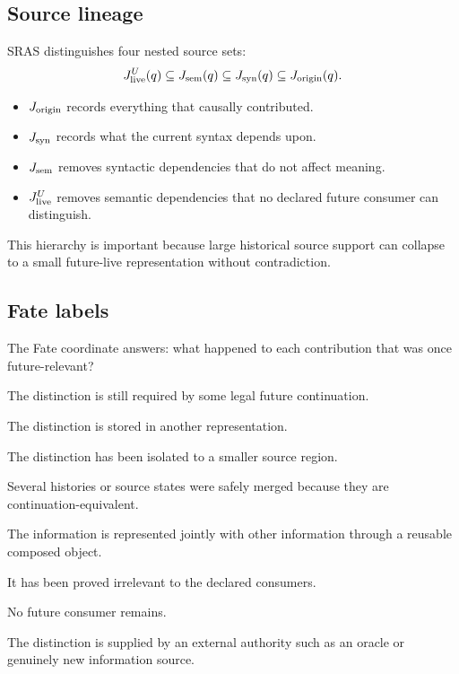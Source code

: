 \documentclass[11pt]{article}
\theoremstyle{plain}
\theoremstyle{definition}
\theoremstyle{remark}
\begin{document}
\subsection{Source lineage}

SRAS distinguishes four nested source sets:
\[
J_{\rm live}^{U}(q)
\subseteq
J_{\rm sem}(q)
\subseteq
J_{\rm syn}(q)
\subseteq
J_{\rm origin}(q).
\]

\begin{itemize}[leftmargin=1.4em]
\item $J_{\rm origin}$ records everything that causally contributed.
\item $J_{\rm syn}$ records what the current syntax depends upon.
\item $J_{\rm sem}$ removes syntactic dependencies that do not affect meaning.
\item $J_{\rm live}^{U}$ removes semantic dependencies that no declared future
consumer can distinguish.
\end{itemize}

This hierarchy is important because large historical source support can
collapse to a small future-live representation without contradiction.

\subsection{Fate labels}

The Fate coordinate answers: what happened to each contribution that was once
future-relevant?

\begin{description}[leftmargin=1.7em,style=nextline]
\item[LIVE] The distinction is still required by some legal future continuation.
\item[ENCODED] The distinction is stored in another representation.
\item[LOCALIZED] The distinction has been isolated to a smaller source region.
\item[QUOTIENTED] Several histories or source states were safely merged because
they are continuation-equivalent.
\item[COMBINED] The information is represented jointly with other information
through a reusable composed object.
\item[IRRELEVANT] It has been proved irrelevant to the declared consumers.
\item[TERMINAL] No future consumer remains.
\item[EXTERNAL] The distinction is supplied by an external authority such as an
oracle or genuinely new information source.
\end{description}
\end{document}

